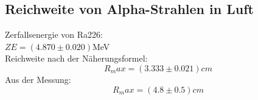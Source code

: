 \documentclass[12pt,a4paper]{article}
\begin{document}
\begin{multicols}{2}
\subsection{Reichweite von Alpha-Strahlen in Luft}

Zerfallsenergie von Ra226: \\
$ZE = (4.870 \pm 0.020)$MeV\\
Reichweite nach der Näherungsformel:
$$R_max =(3.333 \pm 0.021)cm$$
Aus der Messung:
$$R_max = (4.8 \pm 0.5)cm$$


\end{multicols}
\end{document}
